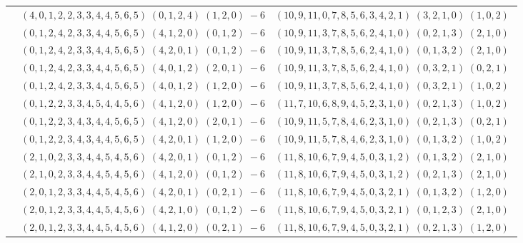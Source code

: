 \documentclass[11pt]{article}
\begin{document}
\begin{longtable}[l]{|c|c|c|}
 \cline{2-3} 
 & $(4 ,0 ,1 ,2 ,2 ,3 ,3 ,4 ,4 ,5 ,6 ,5) \;(0 ,1 ,2 ,4) \;(1 ,2 ,0) \;-6$ & $(10 ,9 ,11 ,0 ,7 ,8 ,5 ,6 ,3 ,4 ,2 ,1) \;(3 ,2 ,1 ,0) \;(1 ,0 ,2) \;$\\ 
 \cline{2-3} 
 & $(0 ,1 ,2 ,4 ,2 ,3 ,3 ,4 ,4 ,5 ,6 ,5) \;(4 ,1 ,2 ,0) \;(0 ,1 ,2) \;-6$ & $(10 ,9 ,11 ,3 ,7 ,8 ,5 ,6 ,2 ,4 ,1 ,0) \;(0 ,2 ,1 ,3) \;(2 ,1 ,0) \;$\\ 
 \cline{2-3} 
 & $(0 ,1 ,2 ,4 ,2 ,3 ,3 ,4 ,4 ,5 ,6 ,5) \;(4 ,2 ,0 ,1) \;(0 ,1 ,2) \;-6$ & $(10 ,9 ,11 ,3 ,7 ,8 ,5 ,6 ,2 ,4 ,1 ,0) \;(0 ,1 ,3 ,2) \;(2 ,1 ,0) \;$\\ 
 \cline{2-3} 
 & $(0 ,1 ,2 ,4 ,2 ,3 ,3 ,4 ,4 ,5 ,6 ,5) \;(4 ,0 ,1 ,2) \;(2 ,0 ,1) \;-6$ & $(10 ,9 ,11 ,3 ,7 ,8 ,5 ,6 ,2 ,4 ,1 ,0) \;(0 ,3 ,2 ,1) \;(0 ,2 ,1) \;$\\ 
 \cline{2-3} 
 & $(0 ,1 ,2 ,4 ,2 ,3 ,3 ,4 ,4 ,5 ,6 ,5) \;(4 ,0 ,1 ,2) \;(1 ,2 ,0) \;-6$ & $(10 ,9 ,11 ,3 ,7 ,8 ,5 ,6 ,2 ,4 ,1 ,0) \;(0 ,3 ,2 ,1) \;(1 ,0 ,2) \;$\\ 
 \cline{2-3} 
 & $(0 ,1 ,2 ,2 ,3 ,3 ,4 ,5 ,4 ,4 ,5 ,6) \;(4 ,1 ,2 ,0) \;(1 ,2 ,0) \;-6$ & $(11 ,7 ,10 ,6 ,8 ,9 ,4 ,5 ,2 ,3 ,1 ,0) \;(0 ,2 ,1 ,3) \;(1 ,0 ,2) \;$\\ 
 \cline{2-3} 
 & $(0 ,1 ,2 ,2 ,3 ,4 ,3 ,4 ,4 ,5 ,6 ,5) \;(4 ,1 ,2 ,0) \;(2 ,0 ,1) \;-6$ & $(10 ,9 ,11 ,5 ,7 ,8 ,4 ,6 ,2 ,3 ,1 ,0) \;(0 ,2 ,1 ,3) \;(0 ,2 ,1) \;$\\ 
 \cline{2-3} 
 & $(0 ,1 ,2 ,2 ,3 ,4 ,3 ,4 ,4 ,5 ,6 ,5) \;(4 ,2 ,0 ,1) \;(1 ,2 ,0) \;-6$ & $(10 ,9 ,11 ,5 ,7 ,8 ,4 ,6 ,2 ,3 ,1 ,0) \;(0 ,1 ,3 ,2) \;(1 ,0 ,2) \;$\\ 
 \cline{2-3} 
 & $(2 ,1 ,0 ,2 ,3 ,3 ,4 ,4 ,5 ,4 ,5 ,6) \;(4 ,2 ,0 ,1) \;(0 ,1 ,2) \;-6$ & $(11 ,8 ,10 ,6 ,7 ,9 ,4 ,5 ,0 ,3 ,1 ,2) \;(0 ,1 ,3 ,2) \;(2 ,1 ,0) \;$\\ 
 \cline{2-3} 
 & $(2 ,1 ,0 ,2 ,3 ,3 ,4 ,4 ,5 ,4 ,5 ,6) \;(4 ,1 ,2 ,0) \;(0 ,1 ,2) \;-6$ & $(11 ,8 ,10 ,6 ,7 ,9 ,4 ,5 ,0 ,3 ,1 ,2) \;(0 ,2 ,1 ,3) \;(2 ,1 ,0) \;$\\ 
 \cline{2-3} 
 & $(2 ,0 ,1 ,2 ,3 ,3 ,4 ,4 ,5 ,4 ,5 ,6) \;(4 ,2 ,0 ,1) \;(0 ,2 ,1) \;-6$ & $(11 ,8 ,10 ,6 ,7 ,9 ,4 ,5 ,0 ,3 ,2 ,1) \;(0 ,1 ,3 ,2) \;(1 ,2 ,0) \;$\\ 
 \cline{2-3} 
 & $(2 ,0 ,1 ,2 ,3 ,3 ,4 ,4 ,5 ,4 ,5 ,6) \;(4 ,2 ,1 ,0) \;(0 ,1 ,2) \;-6$ & $(11 ,8 ,10 ,6 ,7 ,9 ,4 ,5 ,0 ,3 ,2 ,1) \;(0 ,1 ,2 ,3) \;(2 ,1 ,0) \;$\\ 
 \cline{2-3} 
 & $(2 ,0 ,1 ,2 ,3 ,3 ,4 ,4 ,5 ,4 ,5 ,6) \;(4 ,1 ,2 ,0) \;(0 ,2 ,1) \;-6$ & $(11 ,8 ,10 ,6 ,7 ,9 ,4 ,5 ,0 ,3 ,2 ,1) \;(0 ,2 ,1 ,3) \;(1 ,2 ,0) \;$\\ 

\end{longtable}
\end{document}
